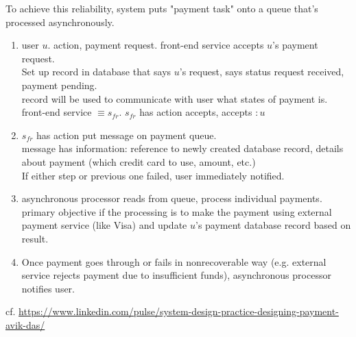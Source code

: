 \documentclass[10pt]{amsart}
\begin{document}
\begin{multicols*}{2}
To achieve this reliability, system puts "payment task" onto a queue that's processed asynchronously.

\begin{enumerate}
	\item user $u$. action, payment request. front-end service accepts $u$'s payment request. \\
	Set up record in database that says $u$'s request, says status request received, payment pending. \\
	record will be used to communicate with user what states of payment is. \\
	front-end service $\equiv s_{fr}$. $s_{fr}$ has action accepts, accepts $ : u$
	\item $s_{fr}$ has action put message on payment queue. \\
	message has information: reference to newly created database record, details about payment (which credit card to use, amount, etc.) \\
	If either step or previous one failed, user immediately notified. 
	\item asynchronous processor reads from queue, process individual payments. \\
	primary objective if the processing is to make the payment using external payment service (like Visa) and update $u$'s payment database record based on result.
	\item Once payment goes through or fails in nonrecoverable way (e.g. external service rejects payment due to insufficient funds), asynchronous processor notifies user.
\end{enumerate}

cf. \url{https://www.linkedin.com/pulse/system-design-practice-designing-payment-avik-das/}


\end{multicols*}
\end{document}
